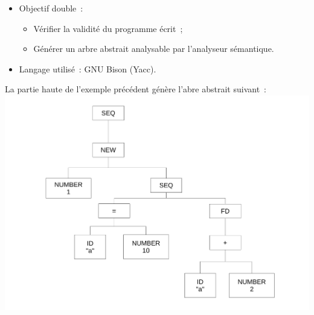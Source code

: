 \begin{frame}
	\begin{itemize}
	\item Objectif double~: 
		\begin{itemize}
		\item Vérifier la validité du programme écrit~;
		\item Générer un arbre abstrait analysable par l'analyseur sémantique.
		\end{itemize}
	\item Langage utilisé~: GNU Bison (Yacc).
	\end{itemize}
\end{frame}

\begin{frame}
La partie haute de l'exemple précédent génère l'abre abstrait suivant~:
\includegraphics[scale=0.3]{doc/Presentation/img/arbre.pdf}
\end{frame}

